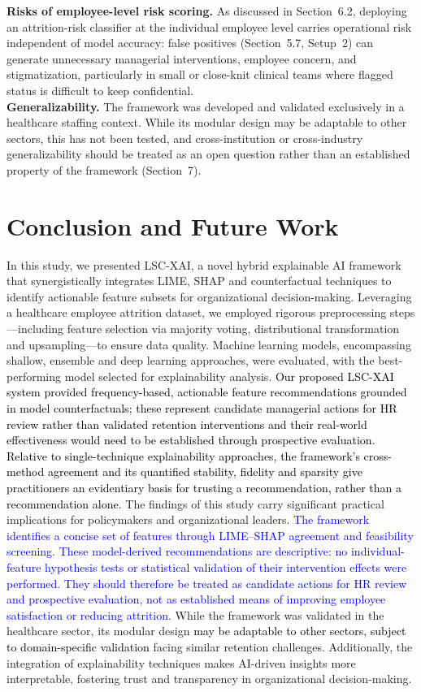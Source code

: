 \documentclass[a4paper,fleqn]{cas-sc}
\begin{document}
{\textbf{Risks of employee-level risk scoring.} As discussed in Section~6.2, deploying an
attrition-risk classifier at the individual employee level carries operational risk independent of model accuracy: false positives (Section~5.7, Setup~2) can generate unnecessary managerial interventions, employee concern, and stigmatization, particularly in small or close-knit clinical teams where flagged status is difficult to keep confidential.\\
\textbf{Generalizability.} The framework was developed and validated exclusively in a healthcare
staffing context. While its modular design may be adaptable to other sectors, this has not been tested, and cross-institution or cross-industry generalizability should be treated as an open question rather than an established property of the framework (Section~7).
}

\section{Conclusion and Future Work}
\label{sec:conclusion}
In this study, we presented LSC-XAI, a novel hybrid explainable AI framework that synergistically integrates LIME, SHAP and counterfactual techniques to identify actionable feature subsets for organizational decision-making. Leveraging a healthcare employee attrition dataset, we employed rigorous preprocessing steps—including feature selection via majority voting, distributional transformation and upsampling—to ensure data quality. Machine learning models, encompassing shallow, ensemble and deep learning approaches, were evaluated, with the best-performing model selected for explainability analysis. \textcolor{black}{Our proposed LSC-XAI system provided frequency-based, actionable feature recommendations grounded in model counterfactuals; these represent candidate managerial actions for HR review rather than validated retention interventions and their real-world effectiveness would need to be established through prospective evaluation. Relative to single-technique explainability approaches, the framework's cross-method agreement and its quantified stability, fidelity and sparsity give practitioners an evidentiary basis for trusting a recommendation, rather than a recommendation alone.}
The findings of this study carry significant practical implications for policymakers and organizational leaders. \textcolor{blue}{The framework identifies a concise set of features through LIME--SHAP agreement and feasibility screening. These model-derived recommendations are descriptive: no individual-feature hypothesis tests or statistical validation of their intervention effects were performed. They should therefore be treated as candidate actions for HR review and prospective evaluation, not as established means of improving employee satisfaction or reducing attrition.} While the framework was validated in the healthcare sector, its modular design \textcolor{black}{may be adaptable to other sectors, subject to domain-specific validation} facing similar retention challenges. Additionally, the integration of explainability techniques makes AI-driven insights more interpretable, fostering trust and transparency in organizational decision-making.
\end{document}
